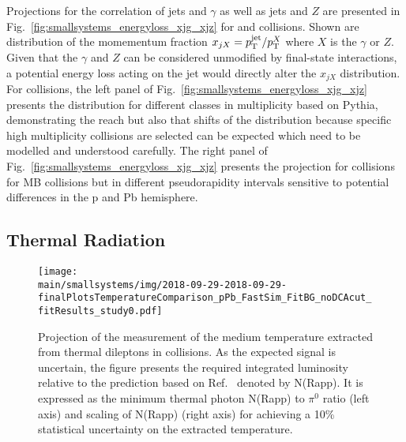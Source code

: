 \documentclass[../report.tex]{subfiles}
\providecommand{\main}{..}
\begin{document}
Projections for the correlation of jets and $\gamma$ as well as jets and $Z$ are presented in Fig.~\ref{fig:smallsystems_energyloss_xjg_xjz} for \pp and \pPb collisions. Shown are distribution of the momementum fraction $x_{jX} = p\sb{\scriptstyle\mathrm{T}}^{\rm jet}/p\sb{\scriptstyle\mathrm{T}}^X$ where $X$ is the $\gamma$ or $Z$. Given that the $\gamma$ and $Z$ can be considered unmodified by final-state interactions, a potential energy loss acting on the jet would directly alter the $x_{jX}$ distribution. For \pp collisions, the left panel of Fig.~\ref{fig:smallsystems_energyloss_xjg_xjz} presents the distribution for different classes in multiplicity based on Pythia, demonstrating the reach but also that shifts of the distribution because specific high multiplicity collisions are selected can be expected which need to be modelled and understood carefully. The right panel of Fig.~\ref{fig:smallsystems_energyloss_xjg_xjz} presents the projection for \pPb collisions for MB collisions but in different pseudorapidity intervals sensitive to potential differences in the p and Pb hemisphere.

\subsection{Thermal Radiation}
\label{sect:smallsystems_thermalradiation}

\begin{figure}[t]
\centering
\texttt{[image: \\main/smallsystems/img/2018-09-29-2018-09-29-finalPlotsTemperatureComparison\_pPb\_FastSim\_FitBG\_noDCAcut\_fitResults\_study0.pdf]}
\caption{Projection of the measurement of the medium temperature extracted from thermal dileptons in \pPb collisions. As the expected signal is uncertain, the figure presents the required integrated luminosity relative to the prediction based on Ref.~\cite{} denoted by N(Rapp). It is expressed as the minimum thermal photon N(Rapp) to $\pi^0$ ratio (left axis) and scaling of N(Rapp) (right axis) for achieving a 10\% statistical uncertainty on the extracted temperature.}
\label{fig:smallsystems_thermal_radition}
\end{figure}
\end{document}
